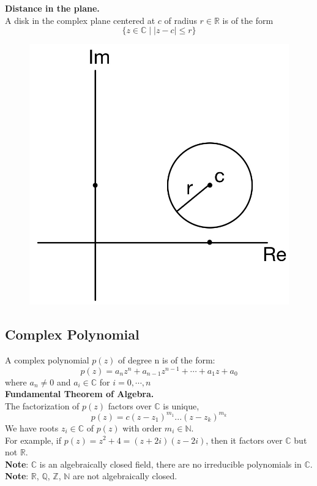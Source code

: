 \documentclass[11pt]{article}
\begin{document}
\textbf{Distance in the plane.} \\
A disk in the complex plane centered at $c$ of radius $r \in \mathbb{R}$ is of the form 
$$\{z \in \mathbb{C} \mid |z - c| \leqslant r\}$$
\begin{figure}[H]
\includegraphics[scale = 0.19]{1_4}
\centering
\end{figure}
\subsection{Complex Polynomial}
A complex polynomial $p(z)$ of degree n is of the form: 
$$p(z) = a_nz^n + a_{n - 1}z^{n - 1} + \cdots + a_1z + a_0$$
where $a_n \neq 0$ and $a_i \in \mathbb{C}$ for $ i = 0, \cdots , n$ \\
\newline
\textbf{Fundamental Theorem of Algebra.} \\

The factorization of $p(z)$ factors over $\mathbb{C}$ is unique, 
$$p(z) = c(z - z_1)^{m_1}...(z - z_k)^{m_k}$$
We have roots $z_i \in \mathbb{C}$ of $p(z)$ with order $m_i \in \mathbb{N}$. \\
For example, if $p(z) = z^2 + 4 = (z + 2i)(z - 2i)$, then it factors over $\mathbb{C}$ but not $\mathbb{R}$. \\
\textbf{Note}: 
$\mathbb{C}$ is an algebraically closed field, there are no irreducible polynomials in $\mathbb{C}$. \\
\textbf{Note}: 
$\mathbb{R}$,  $\mathbb{Q}$, $\mathbb{Z}$, $\mathbb{N}$ are not algebraically closed. \\
\end{document}
